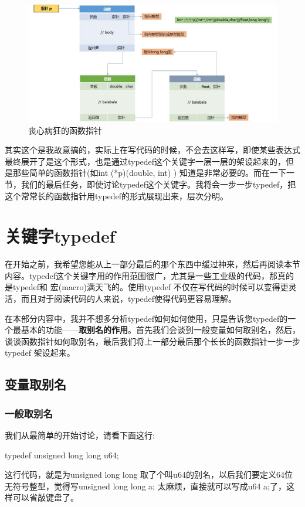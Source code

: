 \documentclass[11pt,twoside,a4paper,titlepage]{article}	%
\newcommand{\kw}[1]{\textcolor[rgb]{0.0,0.0,0.63}{ #1}}
\begin{document}
\begin{figure}[H]
\centering
\includegraphics[scale=.5]{../src/cmpfunpt.jpg}
\caption{丧心病狂的函数指针}
\label{fig:cmpfunpt}
\end{figure}

其实这个是我故意搞的，实际上在写代码的时候，不会去这样写，即使某些表达式最终展开了是这个形式，也是通过typedef这个关键字一层一层的架设起来的，但是那些简单的函数指针(如int (*p)(double, int) ) 知道是非常必要的。而在一下一节，我们的最后任务，即使讨论typedef这个关键字。我将会一步一步typedef，把这个常常长的函数指针用typedef的形式展现出来，层次分明。

\newpage
\section{关键字typedef}
在开始之前，我希望您能从上一部分最后的那个东西中缓过神来，然后再阅读本节内容。typedef这个关键字用的作用范围很广，尤其是一些工业级的代码，那真的是typedef和\kw{宏(macro)}满天飞的。使用typedef 不仅在写代码的时候可以变得更灵活，而且对于阅读代码的人来说，typedef使得代码更容易理解。

在本部分内容中，我并不想多分析typedef如何如何使用，只是告诉您typedef的一个最基本的功能——\textbf{取别名的作用}。首先我们会谈到一般变量如何取别名，然后，谈谈函数指针如何取别名，最后我们将上一部分最后那个长长的函数指针一步一步typedef 架设起来。

\subsection{变量取别名}

\subsubsection{一般取别名}
我们从最简单的开始讨论，请看下面这行:
\begin{center}
{\color{blue}typedef} {\color{violet}unsigned long long} u64;
\end{center}
这行代码，就是为unsigned long long 取了个叫u64的别名，以后我们要定义64位无符号整型，觉得写unsigned long long a; 太麻烦，直接就可以写成u64 a;了，这样可以省敲键盘了。
\end{document}
